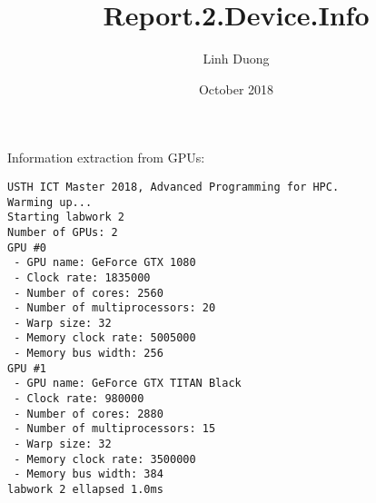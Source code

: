 \documentclass{article}
\title{Report.2.Device.Info}
\author{Linh Duong}
\date{October 2018}
\begin{document}
\maketitle

Information extraction from GPUs:

\begin{verbatim}
USTH ICT Master 2018, Advanced Programming for HPC.
Warming up...
Starting labwork 2
Number of GPUs: 2 
GPU #0 
 - GPU name: GeForce GTX 1080 
 - Clock rate: 1835000 
 - Number of cores: 2560 
 - Number of multiprocessors: 20 
 - Warp size: 32 
 - Memory clock rate: 5005000 
 - Memory bus width: 256 
GPU #1 
 - GPU name: GeForce GTX TITAN Black 
 - Clock rate: 980000 
 - Number of cores: 2880 
 - Number of multiprocessors: 15 
 - Warp size: 32 
 - Memory clock rate: 3500000 
 - Memory bus width: 384 
labwork 2 ellapsed 1.0ms



\end{verbatim}
\end{document}

